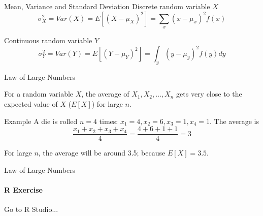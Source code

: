 \documentclass{beamer}\usepackage[]{graphicx}\usepackage[]{color}
\begin{document}
\begin{darkframes}
\begin{frame}[label=lists]{Mean, Variance and Standard Deviation}
        	Discrete random variable $X$
        	$$
				\sigma^2_X = Var(X) = E[(X-\mu_X)^2] = \sum_x (x-\mu_x)^2 f(x)	        	
        	$$
        	
        	Continuous random variable $Y$
        	$$
				\sigma^2_Y = Var(Y) = E[(Y-\mu_Y)^2] = \int_y (y-\mu_y)^2 f(y)dy	        	
        	$$
   			
	\end{frame}





	\begin{frame}[label=lists]{Law of Large Numbers}
		
		\begin{definition}
			For a random variable $X$, the average of $X_1, X_2,\ldots,X_n$ gets very close to the expected value of $X$ ($E[X]$) for large $n$.
		\end{definition}
		\begin{exampleblock}{Example}
			A die is rolled $n=4$ times: $x_1=4, x_2=6, x_3=1, x_4=1$. The average is
			$$
				\frac{x_1 + x_2 + x_3 + x_4}{4} = \frac{4+6+1+1}{4}=3
			$$
		\end{exampleblock}
		
		For large $n$, the average will be around 3.5; because $E[X]=3.5$.
   			
	\end{frame}
	
	
	 
	
	
	
	
	\begin{frame}[label=lists]{Law of Large Numbers}
		\framesubtitle{R Exercise} 
		Go to R Studio...
		
		\rollRie
   			
	\end{frame}





\end{darkframes}
\end{document}
